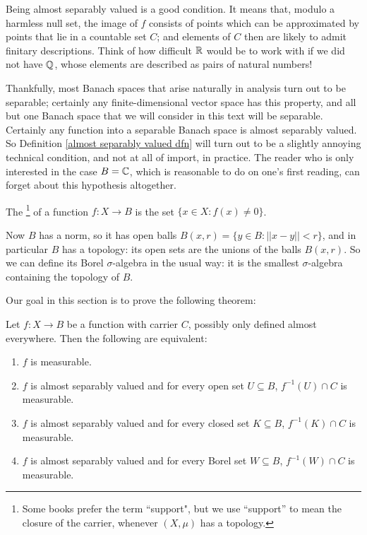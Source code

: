 \begin{subsec}
Being almost separably valued is a good condition. It means that, modulo a harmless null set, the image of $f$ consists of points which can be approximated by points that lie in a countable set $C$; and elements of $C$ then are likely to admit finitary descriptions.
Think of how difficult $\mathbb{R}$ would be to work with if we did not have $\mathbb{Q}$, whose elements are described as pairs of natural numbers!
\end{subsec}

\begin{subsec}
Thankfully, most Banach spaces that arise naturally in analysis turn out to be separable; certainly any finite-dimensional vector space has this property, and all but one Banach space that we will consider in this text will be separable.
Certainly any function into a separable Banach space is almost separably valued. So Definition \ref{almost separably valued dfn} will turn out to be a slightly annoying technical condition, and not at all of import, in practice.
The reader who is only interested in the case $B = \mathbb{C}$, which is reasonable to do on one's first reading, can forget about this hypothesis altogether.
\end{subsec}

\begin{definition}
The \footnote{Some books prefer the term ``support", but we use ``support'' to mean the closure of the carrier, whenever $(X, \mu)$ has a topology.} of a function $f: X \to B$ is the set $\{x \in X: f(x) \neq 0\}$.
\end{definition}

\begin{subsec}
Now $B$ has a norm, so it has open balls $B(x, r) = \{y \in B: ||x - y|| < r\}$, and in particular $B$ has a topology: its open sets are the unions of the balls $B(x, r)$.
So we can define its Borel $\sigma$-algebra in the usual way: it is the smallest $\sigma$-algebra containing the topology of $B$.
\end{subsec}

\begin{subsec}
Our goal in this section is to prove the following theorem:
\end{subsec}

\begin{theorem}
\label{characterization of measurable functions}
Let $f: X \to B$ be a function with carrier $C$, possibly only defined almost everywhere. Then the following are equivalent:
\begin{enumerate}
\item $f$ is measurable.
\item $f$ is almost separably valued and for every open set $U \subseteq B$, $f^{-1}(U) \cap C$ is measurable.
\item $f$ is almost separably valued and for every closed set $K \subseteq B$, $f^{-1}(K) \cap C$ is measurable.
\item $f$ is almost separably valued and for every Borel set $W \subseteq B$, $f^{-1}(W) \cap C$ is measurable.
\end{enumerate}
\end{theorem}

